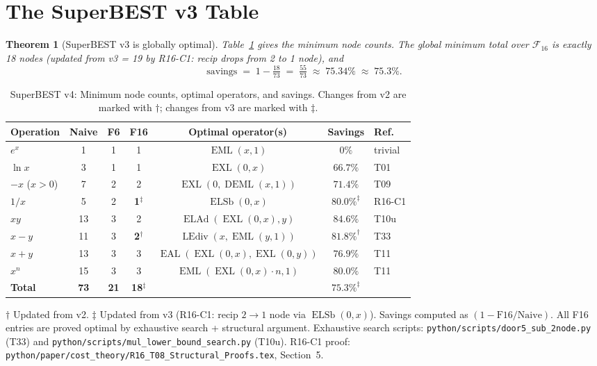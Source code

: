 \documentclass[12pt,a4paper]{article}
\newtheorem{theorem}{Theorem}[section]
\theoremstyle{definition}
\newcommand{\EML}{\operatorname{EML}}
\newcommand{\EXL}{\operatorname{EXL}}
\newcommand{\EAL}{\operatorname{EAL}}
\newcommand{\DEML}{\operatorname{DEML}}
\newcommand{\ELAd}{\operatorname{ELAd}}
\newcommand{\ELSb}{\operatorname{ELSb}}
\newcommand{\LEdiv}{\operatorname{LEdiv}}
\begin{document}
\section{The SuperBEST v3 Table}

\begin{theorem}[SuperBEST v3 is globally optimal]\label{thm:superbest3}
Table~\ref{tab:v3} gives the minimum node counts.
The global minimum total over $\mathcal{F}_{16}$ is exactly 18 nodes (updated
from v3 = 19 by R16-C1: recip drops from 2 to 1 node), and
\[
  \mathrm{savings} \;=\; 1 - \tfrac{18}{73} \;=\; \tfrac{55}{73} \;\approx\; 75.34\%
  \;\approx\; 75.3\%.
\]
\end{theorem}

\begin{table}[h]
\centering
\caption{SuperBEST v4: Minimum node counts, optimal operators, and savings.
         Changes from v2 are marked with $\dagger$; changes from v3 are marked with $\ddagger$.}
\label{tab:v3}
\smallskip
\begin{tabular}{@{}lcccccl@{}}
\toprule
\textbf{Operation}
  & \textbf{Naive}
  & \textbf{F6}
  & \textbf{F16}
  & \textbf{Optimal operator(s)}
  & \textbf{Savings}
  & \textbf{Ref.} \\
\midrule
$e^x$        & 1  & 1 & 1 & $\EML(x,1)$                & $0\%$    & trivial \\
$\ln x$      & 3  & 1 & 1 & $\EXL(0,x)$                & $66.7\%$ & T01 \\
$-x$ ($x>0$) & 7  & 2 & 2 & $\EXL(0,\DEML(x,1))$       & $71.4\%$ & T09 \\
$1/x$        & 5  & 2 & \textbf{1}$^\ddagger$ & $\ELSb(0,x)$   & $\mathbf{80.0\%}^\ddagger$ & R16-C1 \\
$xy$         & 13 & 3 & 2 & $\ELAd(\EXL(0,x),y)$       & $84.6\%$ & T10u \\
$x-y$        & 11 & 3 & \textbf{2}$^\dagger$
                           & $\LEdiv(x,\EML(y,1))$      & $\mathbf{81.8\%}^\dagger$ & T33 \\
$x+y$        & 13 & 3 & 3 & $\EAL(\EXL(0,x),\EXL(0,y))$& $76.9\%$ & T11 \\
$x^n$        & 15 & 3 & 3 & $\EML(\EXL(0,x)\cdot n, 1)$& $80.0\%$ & T11 \\
\midrule
\textbf{Total} & \textbf{73} & \textbf{21} & \textbf{18}$^\ddagger$
  & & $\mathbf{75.3\%}^\ddagger$ & \\
\bottomrule
\end{tabular}

\smallskip
\footnotesize{%
$\dagger$ Updated from v2. $\ddagger$ Updated from v3 (R16-C1: recip $2\to1$ node via $\ELSb(0,x)$).
Savings computed as $(1 - \text{F16}/\text{Naive})$.
All F16 entries are proved optimal by exhaustive search + structural argument.
Exhaustive search scripts: \texttt{python/scripts/door5\_sub\_2node.py}
(T33) and \texttt{python/scripts/mul\_lower\_bound\_search.py} (T10u).
R16-C1 proof: \texttt{python/paper/cost\_theory/R16\_T08\_Structural\_Proofs.tex}, Section~5.
}
\end{table}
\end{document}
